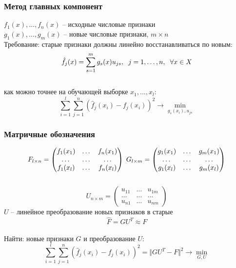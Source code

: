 \documentclass[12pt, aspectratio=169]{beamer}
\begin{document}
\begin{frame}\frametitle{Метод главных компонент}
$f_1(x), \dots, f_n(x)$ -- исходные числовые признаки\\
$g_1(x), \dots, g_m(x)$ -- новые числовые признаки, $m \times n$\\
Требование: старые признаки должны линейно
восстанавливаться по новым:\\
$$\hat{f}_j(x) = \sum\limits_{s=1}^m g_s(x) u_{js} , \hspace{2mm} j = 1,\dots , n, \hspace{2mm} \forall x \in X$$\\
как можно точнее на обучающей выборке $x_1, \dots, x_l$:\\
$$\sum\limits_{i=1}^l \sum\limits_{j=1}^n (\hat{f}_j(x_i) - f_j(x_i))^2 \rightarrow \min\limits_{g_s(x_i), u_{js}}$$
\end{frame}

\begin{frame}\frametitle{Матричные обозначения}
$$F_{l \times n} = \begin{pmatrix}
  f_1(x_1) & \dots & f_n(x_1) \\
  \dots & \dots & \dots\\
  f_1(x_l) & \dots & f_n(x_l)
 \end{pmatrix} \hspace{1mm} G_{l \times m} = \begin{pmatrix}
  g_1(x_1) & \dots & g_m(x_1) \\
  \dots & \dots & \dots\\
  g_1(x_l) & \dots & g_m(x_l)
 \end{pmatrix}$$\\
 $$U_{n \times m} = \begin{pmatrix}
  u_{11} & \dots & u_{1m} \\
  \dots & \dots & \dots\\
  u_{n1} & \dots & u_{nm}
 \end{pmatrix}$$
$U$ -- линейное преобразование новых признаков в старые\\
$$\hat{F} = GU^T \approx F$$\\
Найти: новые признаки $G$ и преобразование $U$:\\
$$\sum\limits_{i=1}^l \sum\limits_{j=1}^n (\hat{f}_j(x_i) - f_j(x_i))^2 = \Vert GU^T - F \Vert^2 \rightarrow \min\limits_{G, U}$$
\end{frame}
\end{document}
